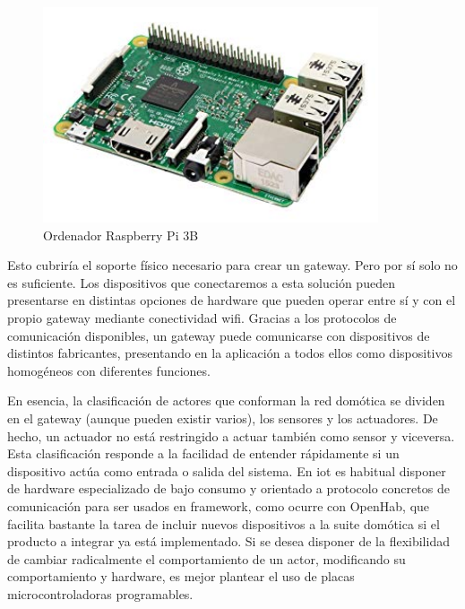 \begin{figure}[hbt!]
\centering
\includegraphics[height=2.5in]{figures/raspberrypi3b.jpg}
\caption[captura de una Raspberry]{Ordenador Raspberry Pi 3B\footnotemark}
\end{figure}

\vspace{1.5cm}


Esto cubriría el soporte físico necesario para crear un \gls{gateway}. Pero por sí solo no es suficiente. Los dispositivos que conectaremos a esta solución pueden presentarse en distintas opciones de hardware que pueden operar entre sí y con el propio \gls{gateway} mediante conectividad \gls{wifi}. Gracias a los protocolos de comunicación disponibles, un \gls{gateway} puede comunicarse con dispositivos de distintos fabricantes, presentando en la aplicación a todos ellos como dispositivos homogéneos con diferentes funciones.

\vspace{1.5cm}

En esencia, la clasificación de actores que conforman la red domótica se dividen en el \gls{gateway} (aunque pueden existir varios), los sensores y los actuadores. De hecho, un actuador no está restringido a actuar también como sensor y viceversa. Esta clasificación responde a la facilidad de entender rápidamente si un dispositivo actúa como entrada o salida del sistema. En \gls{iot} es habitual disponer de hardware especializado de bajo consumo y orientado a protocolo concretos de comunicación para ser usados en \gls{framework}, como ocurre con OpenHab, que facilita bastante la tarea de incluir nuevos dispositivos a la suite domótica si el producto a integrar ya está implementado. Si se desea disponer de la flexibilidad de cambiar radicalmente el comportamiento de un actor, modificando su comportamiento y hardware, es mejor plantear el uso de placas microcontroladoras programables.

